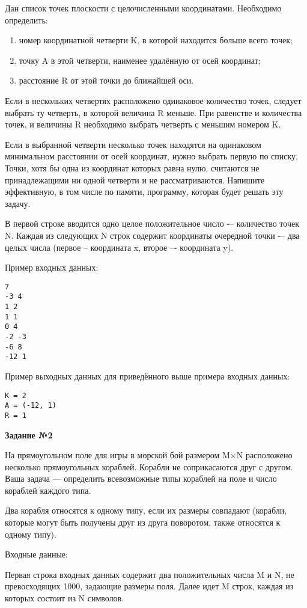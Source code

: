 Дан список точек плоскости с целочисленными координатами. Необходимо определить:

\begin{enumerate}
  \item номер координатной четверти K, в которой находится больше всего точек;
  \item точку A в этой четверти, наименее удалённую от осей координат;
  \item расстояние R от этой точки до ближайшей оси.
\end{enumerate}
  
Если в нескольких четвертях расположено одинаковое количество точек, следует выбрать ту четверть, в которой величина R меньше. При равенстве и количества точек, и величины R необходимо выбрать четверть с меньшим номером K. 

Если в выбранной четверти несколько точек находятся на одинаковом минимальном расстоянии от осей координат, нужно выбрать первую по списку. Точки, хотя бы одна из координат которых равна нулю, считаются не принадлежащими ни одной четверти и не рассматриваются. Напишите эффективную, в том числе по памяти, программу, которая будет решать эту задачу.

В первой строке вводится одно целое положительное число -– количество точек N. Каждая из следующих N строк содержит координаты очередной точки -– два целых числа (первое – координата x, второе –- координата y).

Пример входных данных:
\begin{verbatim}
7
-3 4
1 2
1 1
0 4
-2 -3
-6 8
-12 1
\end{verbatim}

Пример выходных данных для приведённого выше примера входных данных:
\begin{verbatim}
K = 2
A = (-12, 1)
R = 1
\end{verbatim}


{\bf Задание №2}

На прямоугольном поле для игры в морской бой размером M×N расположено несколько прямоугольных кораблей. Корабли не соприкасаются друг с другом. Ваша задача — определить всевозможные типы кораблей на поле и число кораблей каждого типа. 

Два корабля относятся к одному типу, если их размеры совпадают (корабли, которые могут быть получены друг из друга поворотом, также относятся к одному типу).

Входные данные:

Первая строка входных данных содержит два положительных числа M и N, не превосходящих 1000, задающие размеры поля. Далее идет M строк, каждая из которых состоит из N символов. 

